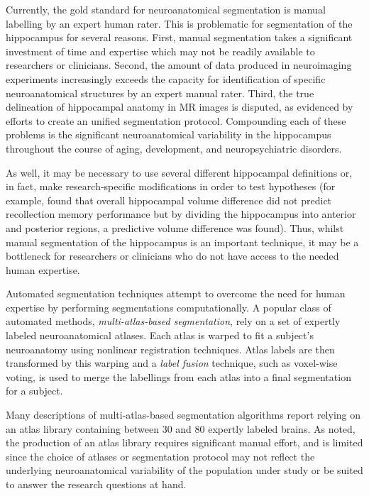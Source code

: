 \documentclass{article}\usepackage{graphicx, color}
\begin{document}
Currently, the gold standard for neuroanatomical segmentation is manual
labelling by an expert human rater.  This is problematic for segmentation of
the hippocampus for several reasons.  First, manual segmentation takes a
significant investment of time and expertise \cite{Hammers2003} which may not
be readily available to researchers or clinicians.  Second, the amount of data
produced in neuroimaging experiments increasingly exceeds the capacity for
identification of specific neuroanatomical structures by an expert manual
rater.  Third, the true delineation of hippocampal anatomy in MR images is
disputed\cite{Geuze2004}, as evidenced by efforts to create an unified
segmentation protocol\cite{Jack2011}.  Compounding each of these problems is
the significant neuroanatomical variability in the hippocampus throughout the
course of aging, development, and neuropsychiatric disorders\cite{Mouiha2011}. 

As well, it may be necessary to use several different hippocampal
definitions or, in fact, make research-specific modifications in order to test
hypotheses (for example, \cite{Poppenk2011} found that overall hippocampal
volume difference did not predict recollection memory performance but by
dividing the hippocampus into anterior and posterior regions, a predictive
volume difference was found).  Thus, whilst manual segmentation of the
hippocampus is an important technique, it may be a bottleneck for researchers
or clinicians who do not have access to the needed human expertise.

Automated segmentation techniques attempt to overcome the need for human
expertise by performing segmentations computationally.  A popular class of
automated methods, {\it multi-atlas-based segmentation}, rely on a set of
expertly labeled neuroanatomical atlases. Each atlas is warped to fit a
subject's neuroanatomy using nonlinear registration
techniques\cite{Collins1995,Klein2009}.  Atlas labels are then transformed
by this warping and a {\it label fusion} technique, such as voxel-wise
voting, is used to merge the labellings from each atlas into a final
segmentation for a subject.  

Many descriptions of multi-atlas-based segmentation algorithms report relying on an
atlas library containing between 30 and 80 expertly labeled
brains\cite{Heckemann2011,Collins2010,Aljabar2009,Leung2010,Lotjonen2010}.
As noted, the production of an atlas library requires significant manual
effort, and is limited since the choice of atlases or segmentation protocol may
not reflect the underlying neuroanatomical variability of the population under
study or be suited to answer the research questions at hand.
\end{document}
